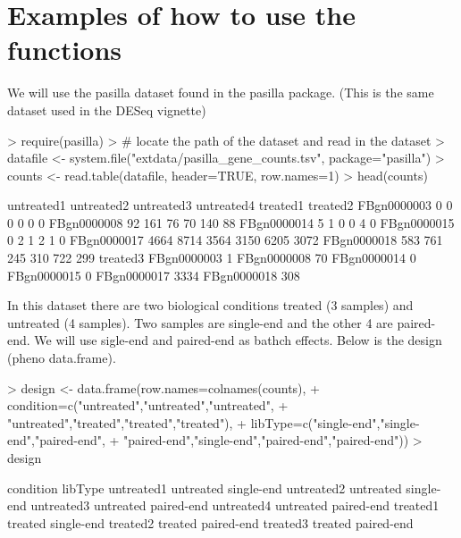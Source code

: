\documentclass{article}
\begin{document}
\section{Examples of how to use the functions}
We will use the pasilla dataset found in the pasilla package. (This is the same dataset used
in the DESeq vignette)
\begin{Schunk}
\begin{Sinput}
> require(pasilla)
> # locate the path of the dataset and read in the dataset
> datafile <- system.file("extdata/pasilla_gene_counts.tsv", package="pasilla")
> counts <- read.table(datafile, header=TRUE, row.names=1)
> head(counts)
\end{Sinput}
\begin{Soutput}
            untreated1 untreated2 untreated3 untreated4 treated1 treated2
FBgn0000003          0          0          0          0        0        0
FBgn0000008         92        161         76         70      140       88
FBgn0000014          5          1          0          0        4        0
FBgn0000015          0          2          1          2        1        0
FBgn0000017       4664       8714       3564       3150     6205     3072
FBgn0000018        583        761        245        310      722      299
            treated3
FBgn0000003        1
FBgn0000008       70
FBgn0000014        0
FBgn0000015        0
FBgn0000017     3334
FBgn0000018      308
\end{Soutput}
\end{Schunk}
In this dataset there are two biological conditions treated (3 samples) and untreated (4 samples). 
Two samples are single-end and the other 4 are paired-end. We will use sigle-end and paired-end
as bathch effects. Below is the design (pheno data.frame).
\begin{Schunk}
\begin{Sinput}
> design <- data.frame(row.names=colnames(counts), 
+                     condition=c("untreated","untreated","untreated",
+                                 "untreated","treated","treated","treated"),
+                     libType=c("single-end","single-end","paired-end",
+                               "paired-end","single-end","paired-end","paired-end"))
> design
\end{Sinput}
\begin{Soutput}
           condition    libType
untreated1 untreated single-end
untreated2 untreated single-end
untreated3 untreated paired-end
untreated4 untreated paired-end
treated1     treated single-end
treated2     treated paired-end
treated3     treated paired-end
\end{Soutput}
\end{Schunk}
\end{document}
